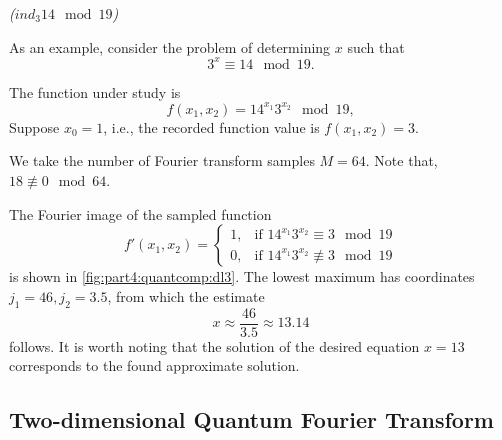 \begin{example}
\emph{($ind_3{14} \mod{19}$)}
%

As an example, consider the problem of determining $x$ such that 
\[
3^x \equiv 14 \mod 19.
\]

The function under study is
\[
f(x_1, x_2) = 14^{x_1} 3^{x_2} \mod 19,
\]
Suppose $x_0 = 1$, i.e., the recorded function value is
$f(x_1, x_2) = 3$.



We take the number of Fourier transform samples $M=64$. Note that,
$18 \not\equiv 0 \mod 64$.

The Fourier image of the sampled function 
\[
f'(x_1, x_2) = 
\begin{cases}
1, & \text{if } 14^{x_1} 3^{x_2} \equiv 3 \mod 19 \\
0, & \text{if } 14^{x_1} 3^{x_2} \not\equiv 3 \mod 19 
\end{cases}
\]
is shown in \autoref{fig:part4:quantcomp:dl3}. The lowest maximum
has coordinates $j_1 = 46, j_2 = 3.5$, from which the estimate
\[
x \approx \frac{46}{3.5} \approx 13.14
\]
follows. It is worth noting that the solution of the desired equation $x = 13$ corresponds
to the found approximate solution.
\label{ex:part4:quantcomp:discretlog:periodfinding2}
\end{example}


\subsection{Two-dimensional Quantum Fourier Transform}



